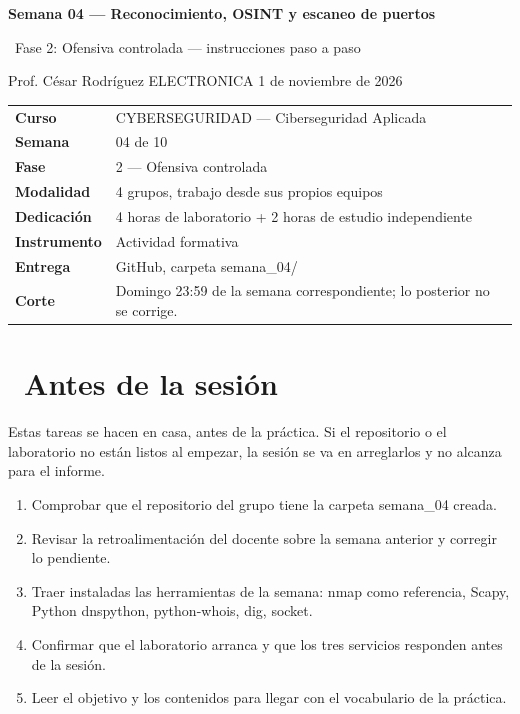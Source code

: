 \documentclass[11pt,a4paper]{article}
\newcommand{\iconoBanda}{microchip}
\newcommand{\bandaTitulo}[3][fondoOscuro]{%
  \begin{tcolorbox}[
    enhanced,
    colback=#1, colframe=#1,
    boxrule=0pt, arc=8pt, outer arc=8pt,
    width=\linewidth,
    top=18pt, bottom=6pt, left=14pt, right=14pt,
    borderline south={3.5pt}{0pt}{cyanNeon},
  ]
    \begin{minipage}[c]{0.07\linewidth}
      \centering
      \textcolor{cyanNeon}{\fontsize{30}{30}\selectfont\faIcon{\iconoBanda}}
    \end{minipage}%
    \hspace{8pt}%
    \begin{minipage}[c]{0.88\linewidth}
      {\fontsize{20}{24}\selectfont\bfseries\color{white}#2}\par\vspace{5pt}%
      \textcolor{cyanNeon!80!white}{\small\faIcon{angle-right}~#3}%
    \end{minipage}
    \vspace{4pt}
  \end{tcolorbox}%
  \vspace{8pt}%
}
\newcommand{\iconotexto}[2]{\textcolor{cyanNeon}{\faIcon{#1}}~#2}
\renewcommand{\iconoBanda}{shield-alt}
\begin{document}
\bandaTitulo[fondoOscuro]{Semana 04 --- Reconocimiento, OSINT y escaneo de puertos}{Fase 2: Ofensiva controlada --- instrucciones paso a paso}

\begin{center}\small\color{grisTexto}Prof. César Rodríguez \textbar{} ELECTRONICA \textbar{} 1 de noviembre de 2026\end{center}

\begin{tabularx}{\linewidth}{@{}>{\raggedright\arraybackslash}p{4.6cm}X@{}}
\toprule
\textbf{Curso} & CYBERSEGURIDAD --- Ciberseguridad Aplicada \\
\textbf{Semana} & 04 de 10 \\
\textbf{Fase} & 2 --- Ofensiva controlada \\
\textbf{Modalidad} & 4 grupos, trabajo desde sus propios equipos \\
\textbf{Dedicación} & 4 horas de laboratorio + 2 horas de estudio independiente \\
\textbf{Instrumento} & Actividad formativa \\
\textbf{Entrega} & GitHub, carpeta semana\_04/ \\
\textbf{Corte} & Domingo 23:59 de la semana correspondiente; lo posterior no se corrige. \\
\bottomrule
\end{tabularx}

\section{\iconotexto{clock}{Antes de la sesión}}

Estas tareas se hacen en casa, antes de la práctica. Si el repositorio o el laboratorio no están listos al empezar, la sesión se va en arreglarlos y no alcanza para el informe.

\begin{enumerate}[leftmargin=1.4em,itemsep=2pt,topsep=3pt]
  \item Comprobar que el repositorio del grupo tiene la carpeta semana\_04 creada.
  \item Revisar la retroalimentación del docente sobre la semana anterior y corregir lo pendiente.
  \item Traer instaladas las herramientas de la semana: nmap como referencia, Scapy, Python dnspython, python-whois, dig, socket.
  \item Confirmar que el laboratorio arranca y que los tres servicios responden antes de la sesión.
  \item Leer el objetivo y los contenidos para llegar con el vocabulario de la práctica.
\end{enumerate}
\end{document}
